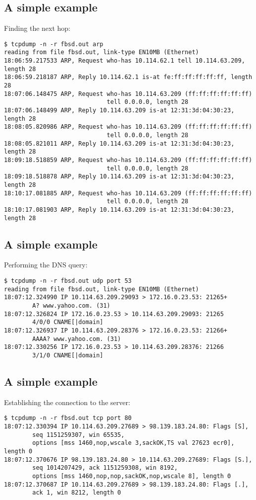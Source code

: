 \documentclass[xga]{xdvislides}
\begin{document}
\subsection{A simple example}
Finding the next hop:
\begin{verbatim}
$ tcpdump -n -r fbsd.out arp
reading from file fbsd.out, link-type EN10MB (Ethernet)
18:06:59.217533 ARP, Request who-has 10.114.62.1 tell 10.114.63.209, length 28
18:06:59.218187 ARP, Reply 10.114.62.1 is-at fe:ff:ff:ff:ff:ff, length 28
18:07:06.148475 ARP, Request who-has 10.114.63.209 (ff:ff:ff:ff:ff:ff)
                             tell 0.0.0.0, length 28
18:07:06.148499 ARP, Reply 10.114.63.209 is-at 12:31:3d:04:30:23, length 28
18:08:05.820986 ARP, Request who-has 10.114.63.209 (ff:ff:ff:ff:ff:ff)
                             tell 0.0.0.0, length 28
18:08:05.821011 ARP, Reply 10.114.63.209 is-at 12:31:3d:04:30:23, length 28
18:09:18.518859 ARP, Request who-has 10.114.63.209 (ff:ff:ff:ff:ff:ff)
                             tell 0.0.0.0, length 28
18:09:18.518878 ARP, Reply 10.114.63.209 is-at 12:31:3d:04:30:23, length 28
18:10:17.081885 ARP, Request who-has 10.114.63.209 (ff:ff:ff:ff:ff:ff)
                             tell 0.0.0.0, length 28
18:10:17.081903 ARP, Reply 10.114.63.209 is-at 12:31:3d:04:30:23, length 28
\end{verbatim}

\subsection{A simple example}
Performing the DNS query:
\begin{verbatim}
$ tcpdump -n -r fbsd.out udp port 53
reading from file fbsd.out, link-type EN10MB (Ethernet)
18:07:12.324990 IP 10.114.63.209.29093 > 172.16.0.23.53: 21265+
        A? www.yahoo.com. (31)
18:07:12.326824 IP 172.16.0.23.53 > 10.114.63.209.29093: 21265
        4/0/0 CNAME[|domain]
18:07:12.326937 IP 10.114.63.209.28376 > 172.16.0.23.53: 21266+
        AAAA? www.yahoo.com. (31)
18:07:12.330256 IP 172.16.0.23.53 > 10.114.63.209.28376: 21266
        3/1/0 CNAME[|domain]
\end{verbatim}

\subsection{A simple example}
Establishing the connection to the server:
\begin{verbatim}
$ tcpdump -n -r fbsd.out tcp port 80
18:07:12.330394 IP 10.114.63.209.27689 > 98.139.183.24.80: Flags [S],
        seq 1151259307, win 65535,
        options [mss 1460,nop,wscale 3,sackOK,TS val 27623 ecr0], length 0
18:07:12.370676 IP 98.139.183.24.80 > 10.114.63.209.27689: Flags [S.],
        seq 1014207429, ack 1151259308, win 8192,
        options [mss 1460,nop,nop,sackOK,nop,wscale 8], length 0
18:07:12.370687 IP 10.114.63.209.27689 > 98.139.183.24.80: Flags [.],
        ack 1, win 8212, length 0
\end{verbatim}
\end{document}
